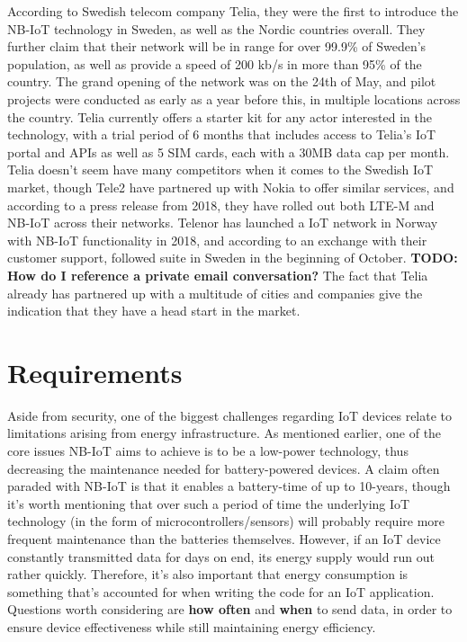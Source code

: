 According to Swedish telecom company Telia, they were the first to introduce the NB-IoT technology in Sweden, as well as the Nordic countries overall.\cite{telia-nb} They further claim that their network will be in range for over 99.9\% of Sweden's population, as well as provide a speed of 200 kb/s in more than 95\% of the country.\cite{telia-first} The grand opening of the network was on the 24th of May, and pilot projects were conducted as early as a year before this, in multiple locations across the country. Telia currently offers a starter kit  for any actor interested in the technology, with a trial period of 6 months that includes access to Telia's IoT portal and APIs as well as 5 SIM cards, each with a 30MB data cap per month. Telia doesn't seem have many competitors when it comes to the Swedish IoT market, though Tele2 have partnered up with Nokia to offer similar services, and according to a press release from 2018, they have rolled out both LTE-M and NB-IoT across their networks.\cite{tele2-nokia} Telenor has launched a IoT network in Norway with NB-IoT functionality in 2018\cite{telenor-iot}, and according to an exchange with their customer support, followed suite in Sweden in the beginning of October. \textbf{TODO: How do I reference a private email conversation?} The fact that Telia already has partnered up with a multitude of cities and companies give the indication that they have a head start in the market.


\section{Requirements}
Aside from security, one of the biggest challenges regarding IoT devices relate to limitations arising from energy infrastructure. As mentioned earlier, one of the core issues NB-IoT aims to achieve is to be a low-power technology, thus decreasing the maintenance needed for battery-powered devices. A claim often paraded with NB-IoT is that it enables a battery-time of up to 10-years\cite{gsma-nb-iot}, though it's worth mentioning that over such a period of time the underlying IoT technology (in the form of microcontrollers/sensors) will probably require more frequent maintenance than the batteries themselves. However, if an IoT device constantly transmitted data for days on end, its energy supply would run out rather quickly. Therefore, it's also important that energy consumption is something that's accounted for when writing the code for an IoT application. Questions worth considering are \textbf{how often} and \textbf{when} to send data, in order to ensure device effectiveness while still maintaining energy efficiency. 

